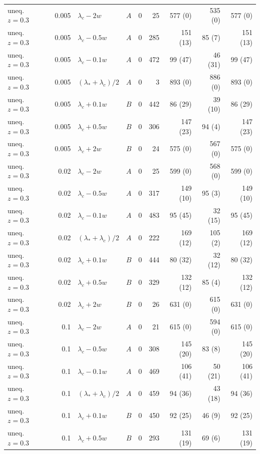 \begin{longtable}{@{}lrllrrrrr@{}}
uneq. $z{=}0.3$ & 0.005 & $\lambda_c-2w$ & $A$ & 0 & 25 & 577 (0) & 535 (0) & 577 (0)\\
uneq. $z{=}0.3$ & 0.005 & $\lambda_c-0.5w$ & $A$ & 0 & 285 & 151 (13) & 85 (7) & 151 (13)\\
uneq. $z{=}0.3$ & 0.005 & $\lambda_c-0.1w$ & $A$ & 0 & 472 & 99 (47) & 46 (31) & 99 (47)\\
uneq. $z{=}0.3$ & 0.005 & $(\lambda_*+\lambda_c)/2$ & $A$ & 0 & 3 & 893 (0) & 886 (0) & 893 (0)\\
uneq. $z{=}0.3$ & 0.005 & $\lambda_c+0.1w$ & $B$ & 0 & 442 & 86 (29) & 39 (10) & 86 (29)\\
uneq. $z{=}0.3$ & 0.005 & $\lambda_c+0.5w$ & $B$ & 0 & 306 & 147 (23) & 94 (4) & 147 (23)\\
uneq. $z{=}0.3$ & 0.005 & $\lambda_c+2w$ & $B$ & 0 & 24 & 575 (0) & 567 (0) & 575 (0)\\
uneq. $z{=}0.3$ & 0.02 & $\lambda_c-2w$ & $A$ & 0 & 25 & 599 (0) & 568 (0) & 599 (0)\\
uneq. $z{=}0.3$ & 0.02 & $\lambda_c-0.5w$ & $A$ & 0 & 317 & 149 (10) & 95 (3) & 149 (10)\\
uneq. $z{=}0.3$ & 0.02 & $\lambda_c-0.1w$ & $A$ & 0 & 483 & 95 (45) & 32 (15) & 95 (45)\\
uneq. $z{=}0.3$ & 0.02 & $(\lambda_*+\lambda_c)/2$ & $A$ & 0 & 222 & 169 (12) & 105 (2) & 169 (12)\\
uneq. $z{=}0.3$ & 0.02 & $\lambda_c+0.1w$ & $B$ & 0 & 444 & 80 (32) & 32 (12) & 80 (32)\\
uneq. $z{=}0.3$ & 0.02 & $\lambda_c+0.5w$ & $B$ & 0 & 329 & 132 (12) & 85 (4) & 132 (12)\\
uneq. $z{=}0.3$ & 0.02 & $\lambda_c+2w$ & $B$ & 0 & 26 & 631 (0) & 615 (0) & 631 (0)\\
uneq. $z{=}0.3$ & 0.1 & $\lambda_c-2w$ & $A$ & 0 & 21 & 615 (0) & 594 (0) & 615 (0)\\
uneq. $z{=}0.3$ & 0.1 & $\lambda_c-0.5w$ & $A$ & 0 & 308 & 145 (20) & 83 (8) & 145 (20)\\
uneq. $z{=}0.3$ & 0.1 & $\lambda_c-0.1w$ & $A$ & 0 & 469 & 106 (41) & 50 (21) & 106 (41)\\
uneq. $z{=}0.3$ & 0.1 & $(\lambda_*+\lambda_c)/2$ & $A$ & 0 & 459 & 94 (36) & 43 (18) & 94 (36)\\
uneq. $z{=}0.3$ & 0.1 & $\lambda_c+0.1w$ & $B$ & 0 & 450 & 92 (25) & 46 (9) & 92 (25)\\
uneq. $z{=}0.3$ & 0.1 & $\lambda_c+0.5w$ & $B$ & 0 & 293 & 131 (19) & 69 (6) & 131 (19)\\

\end{longtable}
